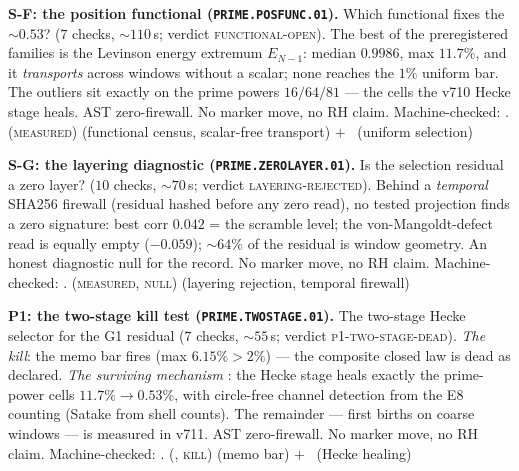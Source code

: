 \documentclass[11pt,a4paper]{article}
\theoremstyle{definition}
\begin{document}
\par\smallskip\noindent\textbf{S-F: the position functional
(\texttt{PRIME.POSFUNC.01}).}
Which functional fixes the $\sim0.53$? ($7$ checks, ${\sim}110$\,s;
verdict \textsc{functional-open}).  The best of the preregistered
families is the Levinson energy extremum $E_{N-1}$: median $0.9986$,
max $11.7\%$, and it \emph{transports} across windows without a
scalar; none reaches the $1\%$ uniform bar.  The outliers sit
exactly on the prime powers $16/64/81$ --- the cells the v710 Hecke
stage heals.  AST zero-firewall.  No marker move, no RH claim.
Machine-checked: .
(\textsc{measured}) (functional census, scalar-free transport) $+$
\mO\ (uniform selection)
\par\smallskip

\par\smallskip\noindent\textbf{S-G: the layering diagnostic
(\texttt{PRIME.ZEROLAYER.01}).}
Is the selection residual a zero layer? ($10$ checks, ${\sim}70$\,s;
verdict \textsc{layering-rejected}).  Behind a \emph{temporal}
SHA256 firewall (residual hashed before any zero read), no tested
projection finds a zero signature: best corr $0.042$ = the scramble
level; the von-Mangoldt-defect read is equally empty ($-0.059$);
${\sim}64\%$ of the residual is window geometry.  An honest
diagnostic null for the record.  No marker move, no RH claim.
Machine-checked: .
(\textsc{measured}, \textsc{null}) (layering rejection, temporal
firewall)
\par\smallskip

\par\smallskip\noindent\textbf{P1: the two-stage kill test
(\texttt{PRIME.TWOSTAGE.01}).}
The two-stage Hecke selector for the G1 residual ($7$ checks,
${\sim}55$\,s; verdict \textsc{p1-two-stage-dead}).  \emph{The
kill}: the memo bar fires (max $6.15\%>2\%$) --- the composite
closed law is dead as declared.  \emph{The surviving mechanism} \mE:
the Hecke stage heals exactly the prime-power cells
$11.7\%\to0.53\%$, with circle-free channel detection from the E8
counting (Satake from shell counts).  The remainder --- first
births on coarse windows --- is measured in v711.  AST
zero-firewall.  No marker move, no RH claim.
Machine-checked: .
(\mE, \textsc{kill}) (memo bar) $+$ \mE\ (Hecke healing)
\par\smallskip
\end{document}
